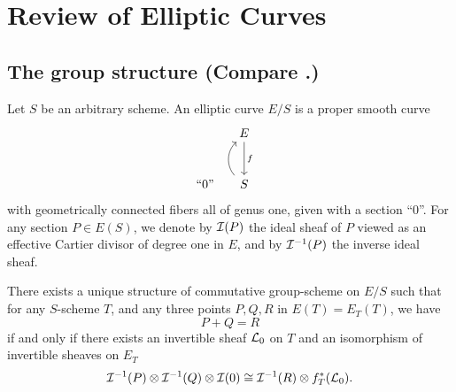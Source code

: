 \chapter{Review of Elliptic Curves}
\label{ch:2}

\section{The group structure (Compare \cite{De2}.)}
\label{sec:2.1}

\kmitem\label{item:2.1.1}
Let $S$ be an arbitrary scheme. An elliptic curve $E/S$ is a proper smooth curve
\[
\begin{tikzcd}[row sep=large, column sep=small]
  & E \arrow[d, "f"] & \\
  \text{``}0\text{''} & S \arrow[u, bend left=45] &
\end{tikzcd}
\]
with geometrically connected fibers all of genus one, given with a section ``$0$''. For any section $P \in E(S)$, we denote by $\mathcal{I}(P)$ the ideal sheaf of $P$ viewed as an effective Cartier divisor of degree one in $E$, and by $\mathcal{I}^{-1}(P)$ the inverse ideal sheaf.

\begin{theorem}[Abel]\label{thm:2.1.2}
There exists a unique structure of commutative group-scheme on $E/S$ such that for any $S$-scheme $T$, and any three points $P, Q, R$ in $E(T) = E_T(T)$, we have
\[
P + Q = R
\]
if and only if there exists an invertible sheaf $\mathcal{L}_0$ on $T$ and an isomorphism of invertible sheaves on $E_T$
\[
\mathcal{I}^{-1}(P) \otimes \mathcal{I}^{-1}(Q) \otimes \mathcal{I}(0) \cong \mathcal{I}^{-1}(R) \otimes f_T^*(\mathcal{L}_0).
\]
\end{theorem}

